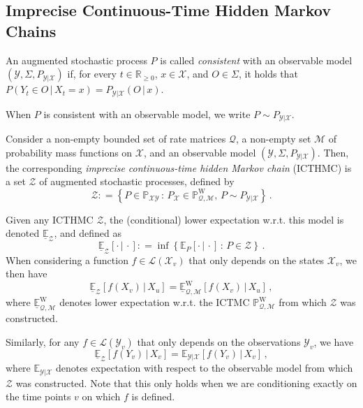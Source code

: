\documentclass[twoside,11pt]{article}
\newcommand{\reals}{\mathbb{R}}
\newcommand{\realsnonneg}{\reals_{\geq 0}}
\newcommand{\states}{\mathcal{X}}
\newcommand{\observs}{\mathcal{Y}}
\newcommand{\processes}{\mathbb{P}}
\newcommand{\wprocesses}{\processes^{\mathrm{W}}}
\newcommand{\lexp}{\underline{\mathbb{E}}_{\rateset,\mathcal{M}}^\mathrm{W}}
\newcommand{\gambles}{\mathcal{L}}
\newcommand{\rateset}{\mathcal{Q}}
\newcommand{\coloneqq}{:\!=}
\begin{document}
\subsection{Imprecise Continuous-Time Hidden Markov Chains}

\begin{definition}
An augmented stochastic process $P$ is called \emph{consistent} with an observable model $(\observs,\Sigma,P_{\observs\vert\states})$ if, for every $t\in\realsnonneg$, $x\in\states$, and $O\in\Sigma$, it holds that $P(Y_t\in O\,\vert\,X_t=x)=P_{\observs\vert\states}(O\,\vert\,x)$.

When $P$ is consistent with an observable model, we write $P\sim P_{\observs\vert\states}$.
\end{definition}

\begin{definition}\label{def:hidden_ictmc}
Consider a non-empty bounded set of rate matrices $\rateset$, a non-empty set $\mathcal{M}$ of probability mass functions on $\states$, and an observable model $(\observs,\Sigma,P_{\observs\vert\states})$. Then, the corresponding \emph{imprecise continuous-time hidden Markov chain} (ICTHMC) is a set $\mathcal{Z}$ of augmented stochastic processes, defined by
\begin{equation*}
\mathcal{Z} \coloneqq \left\{ P\in\mathbb{P}_{\states\observs} \,:\, P_{\states}\in\wprocesses_{\rateset,\mathcal{M}},\, P\sim P_{\observs\vert\states}\right\}\,.
\end{equation*}
\end{definition}

Given any ICTHMC $\mathcal{Z}$, the (conditional) lower expectation w.r.t. this model is denoted $\underline{\mathbb{E}}_\mathcal{Z}$, and defined as
\begin{equation*}
\underline{\mathbb{E}}_\mathcal{Z}[\cdot\,\vert\,\cdot] \coloneqq \inf\left\{ \mathbb{E}_P[\cdot\,\vert\,\cdot]\,:\,P\in\mathcal{Z} \right\}\,.
\end{equation*}
When considering a function $f\in\gambles(\states_v)$ that only depends on the states $\states_v$, we then have
\begin{equation*}
\underline{\mathbb{E}}_\mathcal{Z}[f(X_v)\,\vert\,X_u] = \lexp[f(X_v)\,\vert\,X_u]\,,
\end{equation*}
where $\lexp$ denotes lower expectation w.r.t. the ICTMC $\wprocesses_{\rateset,\mathcal{M}}$ from which $\mathcal{Z}$ was constructed.

Similarly, for any $f\in\gambles(\observs_v)$ that only depends on the observations $\observs_v$, we have
\begin{equation*}
\underline{\mathbb{E}}_\mathcal{Z}[f(Y_v)\,\vert\,X_v] = \mathbb{E}_{\observs\vert\states}[f(Y_v)\,\vert\,X_v]\,,
\end{equation*}
where $\mathbb{E}_{\observs\vert\states}$ denotes expectation with respect to the observable model from which $\mathcal{Z}$ was constructed. Note that this only holds when we are conditioning exactly on the time points $v$ on which $f$ is defined.
\end{document}
